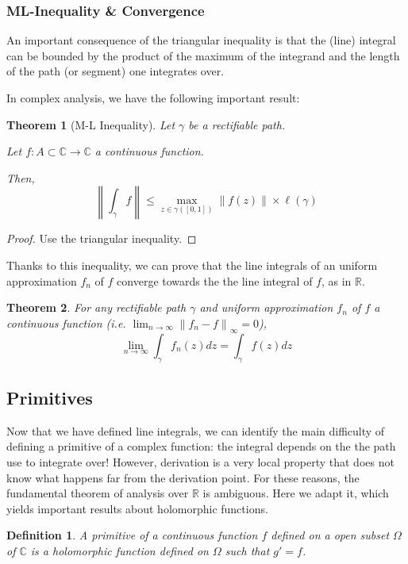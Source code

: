 \documentclass{article}
\newtheorem*{defi}{Definition}
\newtheorem*{thm*}{Theorem}
\begin{document}
\subsubsection{ML-Inequality \& Convergence}

An important consequence of the triangular inequality is that the (line) integral can be bounded by the product of the maximum of the integrand and the length of the path (or segment) one integrates over.

In complex analysis, we have the following important result:

\begin{thm*}[M-L Inequality]
    Let $\gamma$ be a rectifiable path.

    Let $f: A\subset\mathbb{C} \rightarrow \mathbb{C}$ a continuous function.

    Then, 
    $$\boxed{\left\| \int_\gamma f \right\| \leq \max_{z\in \gamma([0,1])}{\| f(z)\|} \times \ell(\gamma)}$$
\end{thm*}

\begin{proof}
    Use the triangular inequality.
\end{proof}

Thanks to this inequality, we can prove that the line integrals of an uniform approximation $f_n$ of $f$ converge towards the the line integral of $f$, as in $\mathbb{R}$.

\begin{thm*}
    For any rectifiable path $\gamma$ and uniform approximation $f_n$ of $f$ a continuous function (i.e. $\lim_{n\rightarrow \infty}\left\| f_n -f \right \|_{\infty} = 0$), 
    $$ \lim_{n\rightarrow\infty} \int_\gamma f_n(z)dz = \int_\gamma f(z)dz $$
\end{thm*}

\subsection{Primitives}

Now that we have defined line integrals, we can identify the main difficulty of defining a primitive of a complex function: the integral depends on the the path use to integrate over! However, derivation is a very local property that does not know what happens far from the derivation point. For these reasons, the fundamental theorem of analysis over $\mathbb{R}$ is ambiguous. Here we adapt it, which yields important results about holomorphic functions.

\begin{defi}
    A primitive of a continuous function $f$ defined on a open subset $\Omega$ of $\mathbb{C}$ is a holomorphic function defined on $\Omega$ such that $g'=f$.
\end{defi}
\end{document}
